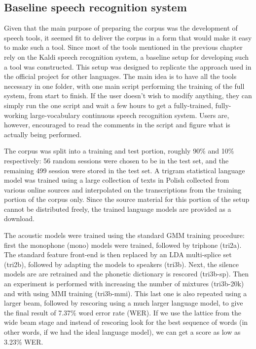 \documentclass[a4paper,11pt]{article}
\begin{document}
\subsection{Baseline speech recognition system}
\label{sec:baseline}

Given that the main purpose of preparing the corpus was the development of speech tools, it seemed fit to deliver the corpus in a form that would make it easy to make such a tool. Since most of the tools mentioned in the previous chapter rely on the Kaldi speech recognition system, a baseline setup for developing such a tool was constructed. This setup was designed to replicate the approach used in the official project for other languages. The main idea is to have all the tools necessary in one folder, with one main script performing the training of the full system, from start to finish. If the user doesn’t wish to modify anything, they can simply run the one script and wait a few hours to get a fully-trained, fully-working large-vocabulary continuous speech recognition system. Users are, however, encouraged to read the comments in the script and figure what is actually being performed.

The corpus was split into a training and test portion, roughly 90\% and 10\% respectively: 56 random sessions were chosen to be in the test set, and the remaining 499 session were stored in the test set. A trigram statistical language model was trained using a large collection of texts in Polish collected from various online sources and interpolated on the transcriptions from the training portion of the corpus only. Since the source material for this portion of the setup cannot be distributed freely, the trained language models are provided as a download.

The acoustic models were trained using the standard GMM training procedure: first the monophone (mono) models were trained, followed by triphone (tri2a). The standard feature front-end is then replaced by an LDA multi-splice set (tri2b), followed by adapting the models to speakers (tri3b). Next, the silence models are are retrained and the phonetic dictionary is rescored (tri3b-sp). Then an experiment is performed with increasing the number of mixtures (tri3b-20k) and with using MMI training (tri3b-mmi). This last one is also repeated using a larger beam, followed by rescoring using a much larger language model, to give the final result of 7.37\% word error rate (WER). If we use the lattice from the wide beam stage and instead of rescoring look for the best sequence of words (in other words, if we had the ideal language model), we can get a score as low as 3.23\% WER. 
\end{document}
